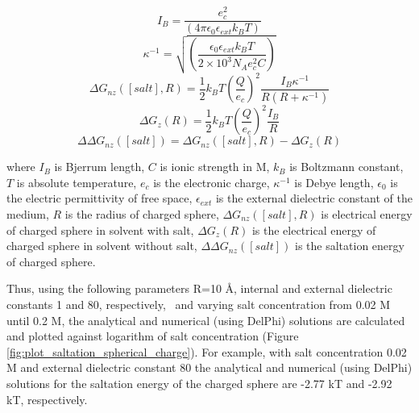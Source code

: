 \documentclass[9pt,tutorial,pubversion]{livecoms}
\begin{document}
\begin{equation}
I_B = \frac{e_c^2}{(4\pi\epsilon_0\epsilon_{ext}k_BT)} 
\end{equation}
\begin{equation}
\kappa^{-1} = \sqrt{\left(\frac{\epsilon_0\epsilon_{ext}k_BT}{2 \times 10^3N_Ae_c^2 C} \right)}
\end{equation}
\begin{equation}
\Delta G_{nz}([salt], R) = \frac{1}{2}k_B T \left(\frac{Q}{e_c}\right)^2\frac{I_B \kappa^{-1}}{R(R+\kappa^{-1})}
\end{equation}
\begin{equation}
\Delta G_z(R) = \frac{1}{2}k_B T \left(\frac{Q}{e_c}\right)^2\frac{I_B}{R}
\end{equation}
\begin{equation}\label{eqn:saltation_23}
\Delta\Delta G_{nz}([salt]) = \Delta G_{nz}([salt], R) - \Delta G_z(R)
\end{equation}

where $I_B$ is Bjerrum length, $ C $ is ionic strength in M, $ k_B $ is Boltzmann constant, $ T $ is absolute temperature, $ e_c $ is the electronic charge, $ \kappa^{-1} $ is Debye length, $ \epsilon_0 $ is the electric permittivity of free space, $ \epsilon_{ext} $ is the external dielectric constant of the medium, $ R $ is the radius of charged sphere, $ \Delta G_{nz}([salt], R) $ is electrical energy of charged sphere in solvent with salt, $ \Delta G_z(R) $ is the electrical energy of charged sphere in solvent without salt, $ \Delta\Delta G_{nz}([salt]) $ is the saltation energy of charged sphere.

Thus, using the following parameters R=10 Å, internal and external dielectric constants 1 and 80, respectively,  and varying salt concentration from 0.02 M until 0.2 M, the analytical and numerical (using DelPhi) solutions are calculated and plotted against logarithm of salt concentration (Figure \ref{fig:plot_saltation_spherical_charge}). For example, with salt concentration 0.02 M and external dielectric constant 80 the analytical and numerical (using DelPhi) solutions for the saltation energy of the charged sphere are -2.77 kT and -2.92 kT, respectively.
\end{document}
